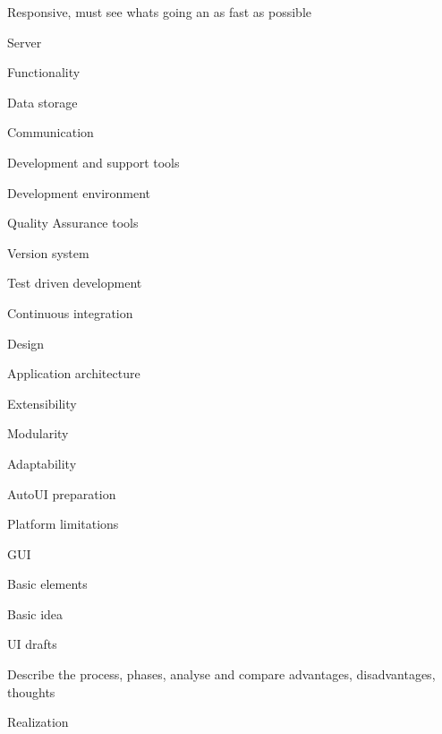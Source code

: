 Responsive, must see whats going an as fast as possible


\sec Server


\secc Functionality


\secc Data storage


\secc Communication


\sec Development and support tools


\secc Development environment


\secc Quality Assurance tools


\secc Version system


\secc Test driven development


\secc Continuous integration



\chap Design


\sec Application architecture


\secc Extensibility


\secc Modularity


\secc Adaptability


\secc AutoUI preparation


\secc Platform limitations


\sec GUI


\secc Basic elements

Basic idea

\secc UI drafts

Describe the process, phases, analyse and compare advantages, disadvantages, thoughts

\chap Realization


